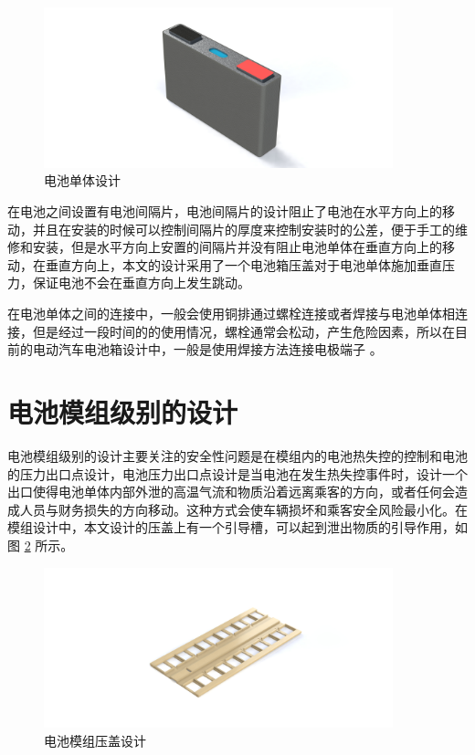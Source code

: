 \begin{figure}
	\centering
	\includegraphics[width=0.9\textwidth]{figures/cell.jpg}
	\caption{电池单体设计}\label{fig:cell}
\end{figure}

在电池之间设置有电池间隔片，电池间隔片的设计阻止了电池在水平方向上的移动，并且在安装的时候可以控制间隔片的厚度来控制安装时的公差，便于手工的维修和安装，但是水平方向上安置的间隔片并没有阻止电池单体在垂直方向上的移动，在垂直方向上，本文的设计采用了一个电池箱压盖对于电池单体施加垂直压力，保证电池不会在垂直方向上发生跳动。

在电池单体之间的连接中，一般会使用铜排通过螺栓连接或者焊接与电池单体相连接，但是经过一段时间的的使用情况，螺栓通常会松动，产生危险因素，所以在目前的电动汽车电池箱设计中，一般是使用焊接方法连接电极端子 \cite{肖宁强2016插电增程式公交车电池系统设计}。

\section{电池模组级别的设计}

电池模组级别的设计主要关注的安全性问题是在模组内的电池热失控的控制和电池的压力出口点设计，电池压力出口点设计是当电池在发生热失控事件时，设计一个出口使得电池单体内部外泄的高温气流和物质沿着远离乘客的方向，或者任何会造成人员与财务损失的方向移动。这种方式会使车辆损坏和乘客安全风险最小化。在模组设计中，本文设计的压盖上有一个引导槽，可以起到泄出物质的引导作用，如图 \ref{fig:upholder} 所示。

\begin{figure}
	\centering
	\includegraphics[width=0.9\textwidth]{figures/upholder.jpg}
	\caption{电池模组压盖设计}\label{fig:upholder}
\end{figure}

